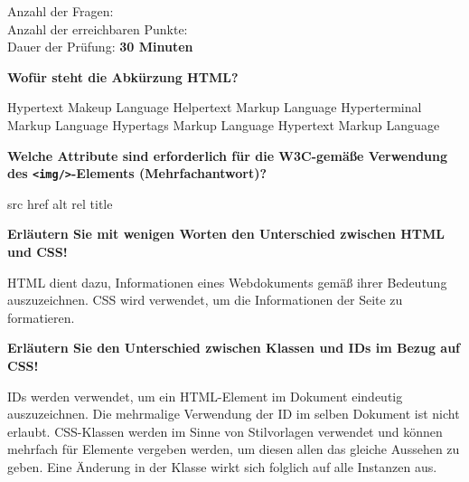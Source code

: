 \documentclass[ngerman,addpoints,10pt]{exam}
\begin{document}
		
\begin{flushleft}
		Anzahl der Fragen: \textbf{\numquestions}\\
		Anzahl der erreichbaren Punkte: \textbf{\numpoints}\\
		Dauer der Prüfung: \textbf{30 Minuten}
\end{flushleft}


		
	\begin{questions}	
	

		\question[10]
		\textbf{Wofür steht die Abkürzung HTML?}
		\droppoints
		
		\begin{checkboxes}
			\choice Hypertext Makeup Language
			\choice Helpertext Markup Language
			\choice Hyperterminal Markup Language
			\choice Hypertags Markup Language
			\CorrectChoice Hypertext Markup Language
		\end{checkboxes}
		\bigskip


		\question[10]
		\textbf{Welche Attribute sind erforderlich für die W3C-gemäße Verwendung des \texttt{<img/>}-Elements (Mehrfachantwort)?}
		\droppoints
		
		\checkboxchar{$\Box$}
		\checkedchar{$\blacksquare$}

		\begin{checkboxes}
			\CorrectChoice src
			\choice href
			\CorrectChoice alt
			\choice rel
			\choice title
		\end{checkboxes}
		\bigskip
		
						
		\question[10]
		\textbf{Erläutern Sie mit wenigen Worten den Unterschied zwischen HTML und CSS!}
		\droppoints
		\begin{solutionorbox}[4cm]
			HTML dient dazu, Informationen eines Webdokuments gemäß ihrer Bedeutung auszuzeichnen.
			CSS wird verwendet, um die Informationen der Seite zu formatieren.
		\end{solutionorbox}
		\bigskip
		
						
		\question[10]
		\textbf{Erläutern Sie den Unterschied zwischen Klassen und IDs im Bezug auf CSS!}
		\droppoints
		\begin{solutionorbox}[4cm]
			IDs werden verwendet, um ein HTML-Element im Dokument eindeutig auszuzeichnen.
			Die mehrmalige Verwendung der ID im selben Dokument ist nicht erlaubt. 
			CSS-Klassen werden im Sinne von Stilvorlagen verwendet und können mehrfach für
			Elemente vergeben werden, um diesen allen das gleiche Aussehen zu geben. Eine
			Änderung in der Klasse wirkt sich folglich auf alle Instanzen aus.
		\end{solutionorbox}
		\bigskip
		

\end{questions}
\end{document}
